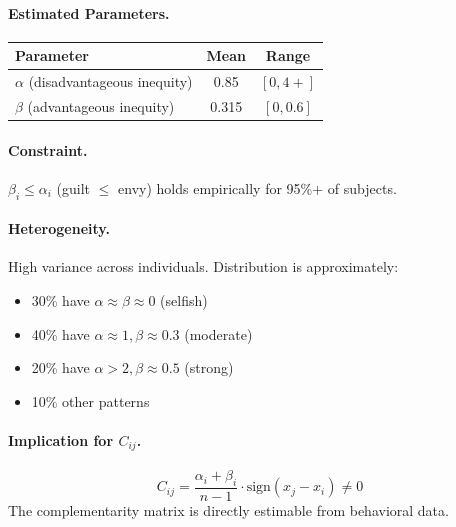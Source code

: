 \paragraph{Estimated Parameters.}
\begin{center}
\begin{tabular}{@{}lcc@{}}
\toprule
\textbf{Parameter} & \textbf{Mean} & \textbf{Range} \\
\midrule
$\alpha$ (disadvantageous inequity) & 0.85 & $[0, 4+]$ \\
$\beta$ (advantageous inequity) & 0.315 & $[0, 0.6]$ \\
\bottomrule
\end{tabular}
\end{center}

\paragraph{Constraint.}
$\beta_i \leq \alpha_i$ (guilt $\leq$ envy) holds empirically for 95\%+ of subjects.

\paragraph{Heterogeneity.}
High variance across individuals. Distribution is approximately:
\begin{itemize}[nosep]
    \item 30\% have $\alpha \approx \beta \approx 0$ (selfish)
    \item 40\% have $\alpha \approx 1, \beta \approx 0.3$ (moderate)
    \item 20\% have $\alpha > 2, \beta \approx 0.5$ (strong)
    \item 10\% other patterns
\end{itemize}

\paragraph{Implication for $C_{ij}$.}
\begin{equation}
C_{ij} = \frac{\alpha_i + \beta_i}{n-1} \cdot \text{sign}(x_j - x_i) \neq 0
\end{equation}
The complementarity matrix is directly estimable from behavioral data.


